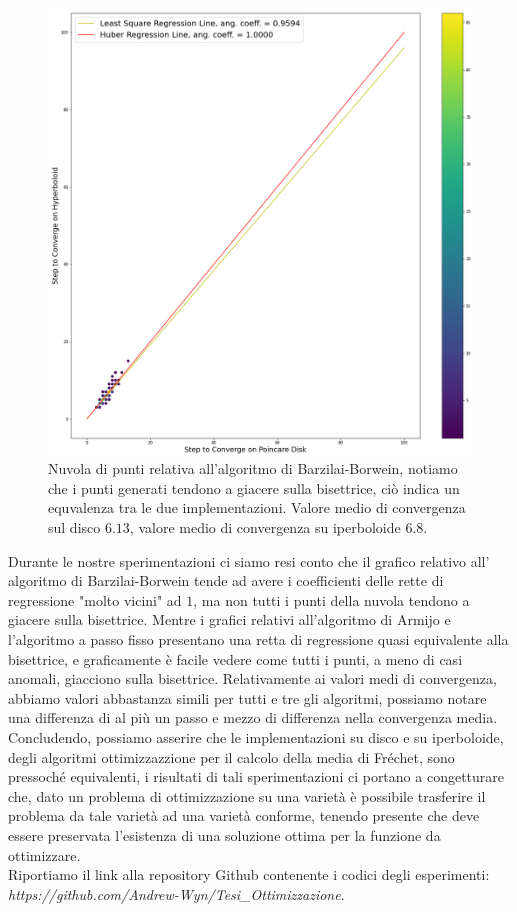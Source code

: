 \documentclass[a4paper, 12pt]{article}
\begin{document}
\begin{figure}[H] %
    \centering\includegraphics[width=1\textwidth]{barzilai_borwein.png}
    \caption{Nuvola di punti relativa all'algoritmo di Barzilai-Borwein, notiamo che i punti generati tendono a giacere sulla bisettrice, ciò indica un equvalenza tra le due implementazioni. Valore medio di convergenza sul disco $6.13$, valore medio di convergenza su iperboloide $6.8$.}
\end{figure}
Durante le nostre sperimentazioni ci siamo resi conto che il grafico relativo all' algoritmo di Barzilai-Borwein tende ad avere i coefficienti delle rette di regressione "molto vicini" ad $1$, ma non tutti i punti della nuvola tendono a giacere sulla bisettrice. Mentre i grafici relativi all'algoritmo di Armijo e l'algoritmo a passo fisso presentano una retta di regressione quasi equivalente alla bisettrice, e graficamente è facile vedere come tutti i punti, a meno di casi anomali, giacciono sulla bisettrice. Relativamente ai valori medi di convergenza, abbiamo valori abbastanza simili per tutti e tre gli algoritmi, possiamo notare una differenza di al più un passo e mezzo di differenza nella convergenza media.\\
Concludendo, possiamo asserire che le implementazioni su disco e su iperboloide, degli algoritmi ottimizzazzione per il calcolo della media di Fréchet, sono pressoché equivalenti, i risultati di tali sperimentazioni ci portano a congetturare che, dato un problema di ottimizzazione su una varietà è possibile trasferire il problema da tale varietà ad una varietà conforme, tenendo presente che deve essere preservata l'esistenza di una soluzione ottima per la funzione da ottimizzare.\\
Riportiamo il link alla repository Github contenente i codici degli esperimenti: \textit{https://github.com/Andrew-Wyn/Tesi\_Ottimizzazione}.
\end{document}
